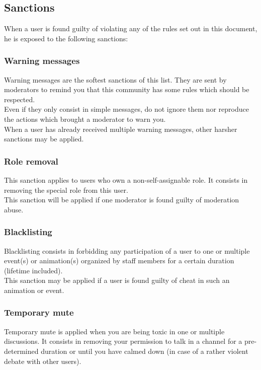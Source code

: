 \documentclass[a4paper]{article}
\begin{document}
\subsection{Sanctions}
When a user is found guilty of violating any of the rules set out in this document, he is exposed to the following sanctions:

\subsubsection{Warning messages}
Warning messages are the softest sanctions of this list. They are sent by moderators to remind you that this community has some rules which should be respected.\\
Even if they only consist in simple messages, do not ignore them nor reproduce the actions which brought a moderator to warn you.\\
When a user has already received multiple warning messages, other harsher sanctions may be applied.

\subsubsection{Role removal}
This sanction applies to users who own a non-self-assignable role. It consists in removing the special role from this user.\\
This sanction will be applied if one moderator is found guilty of moderation abuse.

\subsubsection{Blacklisting}
Blacklisting consists in forbidding any participation of a user to one or multiple event(s) or animation(s) organized by staff members for a certain duration (lifetime included).\\
This sanction may be applied if a user is found guilty of cheat in such an animation or event.

\subsubsection{Temporary mute}
Temporary mute is applied when you are being toxic in one or multiple discussions. It consists in removing your permission to talk in a channel for a pre-determined duration or until you have calmed down (in case of a rather violent debate with other users).
\end{document}
